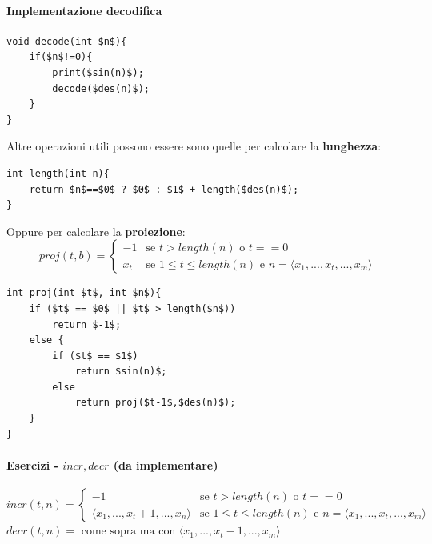 \documentclass{article}
\begin{document}
\paragraph{Implementazione decodifica}\mbox{}
\begin{lstlisting}[mathescape=true]
void decode(int $n$){
    if($n$!=0){
        print($sin(n)$);
        decode($des(n)$);
    }
}
\end{lstlisting}
Altre operazioni utili possono essere sono quelle per calcolare la \textbf{lunghezza}:
\begin{lstlisting}[mathescape]
int length(int n){
    return $n$==$0$ ? $0$ : $1$ + length($des(n)$);
}
\end{lstlisting}
Oppure per calcolare la \textbf{proiezione}:
\[
    proj(t,b)=
    \begin{cases}
        -1  & \text{se } t>length(n)\text{ o }t==0                                           \\
        x_t & \text{se }1\leq t\leq length(n)\text{ e }n=\langle x_1,...,x_t,..., x_m\rangle
    \end{cases}
\]
\begin{lstlisting}[mathescape]
int proj(int $t$, int $n$){
    if ($t$ == $0$ || $t$ > length($n$))
        return $-1$;
    else {
        if ($t$ == $1$)
            return $sin(n)$;
        else
            return proj($t-1$,$des(n)$);
    }
}
\end{lstlisting}
\paragraph{Esercizi - $incr,decr$ (da implementare)}\mbox{}
\[incr(t,n)=
    \begin{cases}
        -1                                    & \text{se }t>length(n)\text{ o }t==0                                            \\
        \langle x_1, ...,x_t+1,...,x_n\rangle & \text{se } 1\leq t\leq length(n)\text{ e }n=\langle x_1,...,x_t,...,x_m\rangle
    \end{cases}
\]
$decr(t,n)=\text{ come sopra ma con }\langle x_1,...,x_t-1,...,x_m\rangle$
\end{document}

